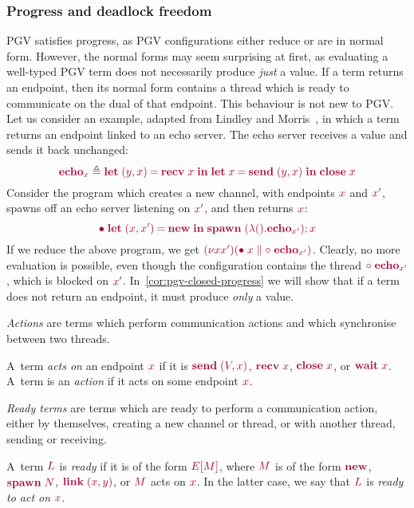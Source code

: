 \documentclass[main.tex]{subfiles}
\begin{document}
\subsubsection*{Progress and deadlock freedom}
PGV satisfies progress, as PGV configurations either reduce or are in normal form. However, the normal forms may seem surprising at first, as evaluating a well-typed PGV term does not necessarily produce \emph{just} a value. If a term returns an endpoint, then its normal form contains a thread which is ready to communicate on the dual of that endpoint. This behaviour is not new to PGV. Let us consider an example, adapted from Lindley and Morris~\cite{lindleymorris15}, in which a term returns an endpoint linked to an echo server. The echo server receives a value and sends it back unchanged:
\[
  \tm{\echo_x} \defeq \tm{\letpair{y}{x}{\recv\;{x}}{\letbind{x}{\send\;\pair{y}{x}}{\close\;x}}}
\]
Consider the program which creates a new channel, with endpoints $\tm{x}$ and $\tm{x'}$, spawns off an echo server listening on $\tm{x'}$, and then returns $\tm{x}$:
\[
  \tm{\main\;\letpair{x}{x'}{\new}{\andthen{\spawn\;(\lambda\unit.\echo_{x'})}}{x}}
\]
If we reduce the above program, we get $\tm{\res{x}{x'}{(\ppar{\main\;x}{\child\;\echo_{x'}})}}$. Clearly, no more evaluation is possible, even though the configuration contains the thread $\tm{\child\;\echo_{x'}}$, which is blocked on $\tm{x'}$. In~\cref{cor:pgv-closed-progress} we will show that if a term does not return an endpoint, it must produce \emph{only} a value.

\emph{Actions} are terms which perform communication actions and which synchronise between two threads.
\begin{definition}[Actions]%
  \label{def:pgv-actions}
  A~term \emph{acts on} an endpoint $\tm{x}$ if it is $\tm{\send\;\pair{V}{x}}$, $\tm{\recv\;{x}}$, $\tm{\close\;{x}}$, or $\tm{\wait\;{x}}$. A~term is an \emph{action} if it acts on some endpoint $\tm{x}$.
\end{definition}

\emph{Ready terms} are terms which are ready to perform a communication action, either by themselves, \eg creating a new channel or thread, or with another thread, \eg sending or receiving.
\begin{definition}%
  \label{def:pgv-ready-actions}
  A~term $\tm{L}$ is \emph{ready} if it is of the form $\tm{\plug{E}{M}}$, where $\tm{M}$ is of the form $\tm{\new}$, $\tm{\spawn\;N}$, $\tm{\link\;\pair{x}{y}}$, or $\tm{M}$ acts on $\tm{x}$. In the latter case, we say that $\tm{L}$ is \emph{ready to act on} $\tm{x}$.
\end{definition}
\end{document}
